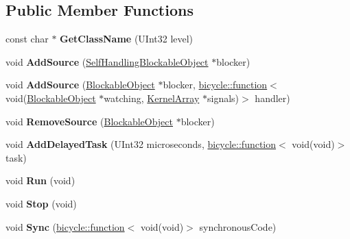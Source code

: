 \subsection*{Public Member Functions}
\begin{DoxyCompactItemize}
\item 
\mbox{\label{class_runloop_ae76fa4415c8add83ed8c3c27c7c3f0ad}} 
const char $\ast$ {\bfseries Get\+Class\+Name} (U\+Int32 level)
\item 
\mbox{\label{class_runloop_a6ccff9ef0b5888e71bb3d8e4cfab2526}} 
void {\bfseries Add\+Source} (\hyperlink{class_runloop_1_1_self_handling_blockable_object}{Self\+Handling\+Blockable\+Object} $\ast$blocker)
\item 
\mbox{\label{class_runloop_ac112273eff6fa3d26463124e3b26b4a7}} 
void {\bfseries Add\+Source} (\hyperlink{class_blockable_object}{Blockable\+Object} $\ast$blocker, \hyperlink{classbicycle_1_1function}{bicycle\+::function}$<$ void(\hyperlink{class_blockable_object}{Blockable\+Object} $\ast$watching, \hyperlink{class_kernel_array}{Kernel\+Array} $\ast$signals)$>$ handler)
\item 
\mbox{\label{class_runloop_a10a87ba53e9bd157cddc0e89a824fcd5}} 
void {\bfseries Remove\+Source} (\hyperlink{class_blockable_object}{Blockable\+Object} $\ast$blocker)
\item 
\mbox{\label{class_runloop_a400c648328ae0257b36f6c5a6a795196}} 
void {\bfseries Add\+Delayed\+Task} (U\+Int32 microseconds, \hyperlink{classbicycle_1_1function}{bicycle\+::function}$<$ void(void)$>$ task)
\item 
\mbox{\label{class_runloop_acd795a05217f22f0d22817717aa9557a}} 
void {\bfseries Run} (void)
\item 
\mbox{\label{class_runloop_a63c722898462db076eb4e996e77bfbe1}} 
void {\bfseries Stop} (void)
\item 
\mbox{\label{class_runloop_a8e35aab876127353b54092247494f5b7}} 
void {\bfseries Sync} (\hyperlink{classbicycle_1_1function}{bicycle\+::function}$<$ void(void)$>$ synchronous\+Code)
\end{DoxyCompactItemize}
